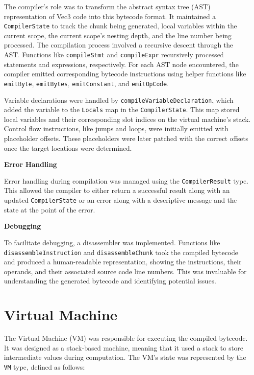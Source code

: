 The compiler's role was to transform the abstract syntax tree (AST) representation of Vec3 code into this bytecode format. It maintained a \texttt{CompilerState} to track the chunk being generated, local variables within the current scope, the current scope's nesting depth, and the line number being processed. The compilation process involved a recursive descent through the AST. Functions like \texttt{compileStmt} and \texttt{compileExpr} recursively processed statements and expressions, respectively. For each AST node encountered, the compiler emitted corresponding bytecode instructions using helper functions like \texttt{emitByte}, \texttt{emitBytes}, \texttt{emitConstant}, and \texttt{emitOpCode}.

Variable declarations were handled by \texttt{compileVariableDeclaration}, which added the variable to the \texttt{Locals} map in the \texttt{CompilerState}. This map stored local variables and their corresponding slot indices on the virtual machine's stack. Control flow instructions, like jumps and loops, were initially emitted with placeholder offsets. These placeholders were later patched with the correct offsets once the target locations were determined.

\textbf{Error Handling}

Error handling during compilation was managed using the \texttt{CompilerResult} type. This allowed the compiler to either return a successful result along with an updated \texttt{CompilerState} or an error along with a descriptive message and the state at the point of the error.

\textbf{Debugging}

To facilitate debugging, a disassembler was implemented. Functions like \texttt{disassembleInstruction} and \texttt{disassembleChunk} took the compiled bytecode and produced a human-readable representation, showing the instructions, their operands, and their associated source code line numbers. This was invaluable for understanding the generated bytecode and identifying potential issues.

\section{Virtual Machine}

The Virtual Machine (VM) was responsible for executing the compiled bytecode. It was designed as a stack-based machine, meaning that it used a stack to store intermediate values during computation. The VM's state was represented by the \texttt{VM} type, defined as follows:

